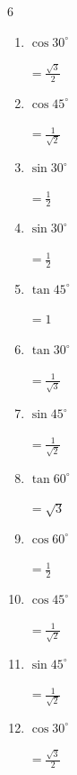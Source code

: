 \begin{multicols}{6}
\begin{enumerate}
        $\displaystyle =\frac{\sqrt{3}}{2}$

  \item $\displaystyle \cos{30^\circ}$

        $\displaystyle =\frac{\sqrt{3}}{2}$

  \item $\displaystyle \cos{45^\circ}$

        $\displaystyle =\frac{1}{\sqrt{2}}$

  \item $\displaystyle \sin{30^\circ}$

        $\displaystyle =\frac{1}{2}$

  \item $\displaystyle \sin{30^\circ}$

        $\displaystyle =\frac{1}{2}$

  \item $\displaystyle \tan{45^\circ}$

        $\displaystyle =1$

  \item $\displaystyle \tan{30^\circ}$

        $\displaystyle =\frac{1}{\sqrt{3}}$

  \item $\displaystyle \sin{45^\circ}$

        $\displaystyle =\frac{1}{\sqrt{2}}$

\columnbreak %

\resetques

  \item $\displaystyle \tan{60^\circ}$

        $\displaystyle =\sqrt{3}$

  \item $\displaystyle \cos{60^\circ}$

        $\displaystyle =\frac{1}{2}$

  \item $\displaystyle \cos{45^\circ}$

        $\displaystyle =\frac{1}{\sqrt{2}}$

  \item $\displaystyle \sin{45^\circ}$

        $\displaystyle =\frac{1}{\sqrt{2}}$

  \item $\displaystyle \cos{30^\circ}$

        $\displaystyle =\frac{\sqrt{3}}{2}$


\end{enumerate}
\end{multicols}
